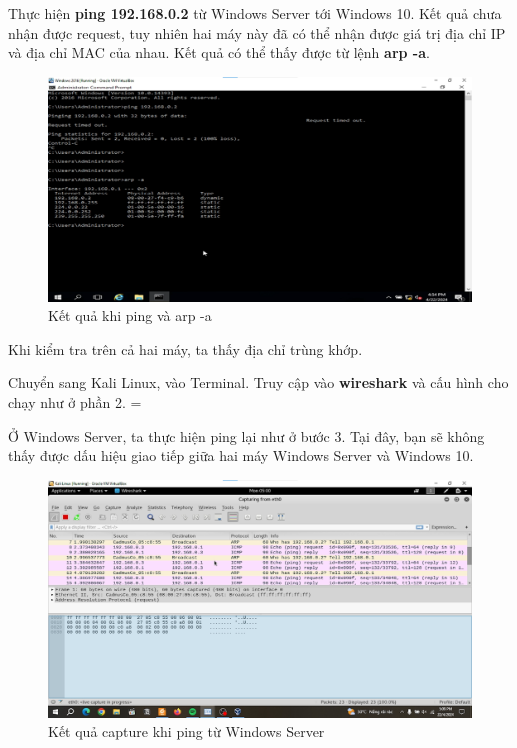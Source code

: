 \newpage

 Thực hiện \textbf{ping 192.168.0.2} từ Windows Server tới Windows 10. Kết quả chưa nhận được request, tuy nhiên hai máy này đã có thể nhận được giá trị địa chỉ IP và địa chỉ MAC của nhau. Kết quả có thể thấy được từ lệnh \textbf{arp -a}.

\begin{figure}[!htb]
    \centering
    \includegraphics[width=0.9\linewidth]{figure//chapter5//lab5_3/ping_from_windows_server.png}
    \caption{Kết quả khi ping và arp -a}
    \label{fig:enter-label}
\end{figure}

Khi kiểm tra trên cả hai máy, ta thấy địa chỉ trùng khớp.

 Chuyển sang Kali Linux, vào Terminal. Truy cập vào \textbf{wireshark} và cấu hình cho chạy như ở phần 2. =

 Ở Windows Server, ta thực hiện ping lại như ở bước 3. Tại đây, bạn sẽ không thấy được dấu hiệu giao tiếp giữa hai máy Windows Server và Windows 10.

\begin{figure}[!htb]
    \centering
    \includegraphics[width=0.9\linewidth]{figure//chapter5//lab5_3/first_test_ping.png}
    \caption{Kết quả capture khi ping từ Windows Server}
    \label{fig:enter-label}
\end{figure}

